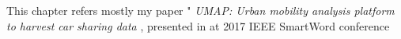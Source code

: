 %
%

This chapter refers mostly my paper " \textit{UMAP: Urban mobility analysis platform to harvest car sharing data} \cite{ciociolaumap}, presented in at 2017 IEEE SmartWord conference


